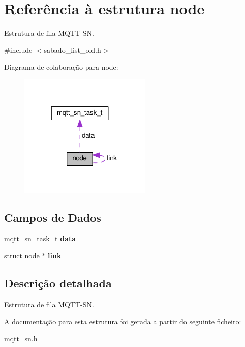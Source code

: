 \hypertarget{structnode}{\section{Referência à estrutura node}
\label{structnode}
}


Estrutura de fila M\+Q\+T\+T-\/\+S\+N.  




{\ttfamily \#include $<$sabado\+\_\+list\+\_\+old.\+h$>$}



Diagrama de colaboração para node\+:\nopagebreak
\begin{figure}[H]
\begin{center}
\leavevmode
\includegraphics[width=178pt]{structnode__coll__graph}
\end{center}
\end{figure}
\subsection*{Campos de Dados}
\begin{DoxyCompactItemize}
\item 
\hypertarget{structnode_a2a4aa9e422389a8d7a97309a99143ce2}{\hyperlink{structmqtt__sn__task__t}{mqtt\+\_\+sn\+\_\+task\+\_\+t} {\bfseries data}}\label{structnode_a2a4aa9e422389a8d7a97309a99143ce2}

\item 
\hypertarget{structnode_ae20eb3a9a05750fd84dd04b48a8940c3}{struct \hyperlink{structnode}{node} $\ast$ {\bfseries link}}\label{structnode_ae20eb3a9a05750fd84dd04b48a8940c3}

\end{DoxyCompactItemize}


\subsection{Descrição detalhada}
Estrutura de fila M\+Q\+T\+T-\/\+S\+N. 

A documentação para esta estrutura foi gerada a partir do seguinte ficheiro\+:\begin{DoxyCompactItemize}
\item 
\hyperlink{mqtt__sn_8h}{mqtt\+\_\+sn.\+h}\end{DoxyCompactItemize}
